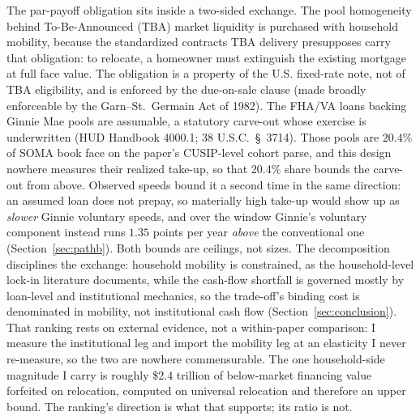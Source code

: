 The par-payoff obligation sits inside a two-sided exchange. The pool homogeneity behind To-Be-Announced (TBA) market liquidity \citep[the market's institutional design is reviewed in][]{fuster2023} is purchased with household mobility, because the standardized contracts TBA delivery presupposes carry that obligation: to relocate, a homeowner must extinguish the existing mortgage at full face value. The obligation is a property of the U.S. fixed-rate note, not of TBA eligibility, and is enforced by the due-on-sale clause (made broadly enforceable by the Garn--St.~Germain Act of 1982). The FHA/VA loans backing Ginnie Mae pools are assumable, a statutory carve-out whose exercise is underwritten (HUD Handbook 4000.1; 38 U.S.C.~\S~3714). Those pools are 20.4\% of SOMA book face on the paper's CUSIP-level cohort parse, and this design nowhere measures their realized take-up, so that 20.4\% share bounds the carve-out from above. Observed speeds bound it a second time in the same direction: an assumed loan does not prepay, so materially high take-up would show up as \emph{slower} Ginnie voluntary speeds, and over the window Ginnie's voluntary component instead runs $1.35$ points per year \emph{above} the conventional one (Section~\ref{sec:pathb}). Both bounds are ceilings, not sizes. The decomposition disciplines the exchange: household mobility is constrained, as the household-level lock-in literature documents, while the cash-flow shortfall is governed mostly by loan-level and institutional mechanics, so the trade-off's binding cost is denominated in mobility, not institutional cash flow (Section~\ref{sec:conclusion}). That ranking rests on external evidence, not a within-paper comparison: I measure the institutional leg and import the mobility leg at an elasticity I never re-measure, so the two are nowhere commensurable. The one household-side magnitude I carry is  roughly \$2.4 trillion of below-market financing value forfeited on relocation, computed on universal relocation and therefore an upper bound. The ranking's direction is what that supports; its ratio is not.

